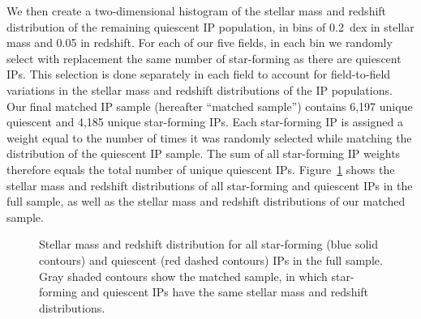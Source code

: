 We then create a two-dimensional histogram of the stellar mass and redshift distribution of the remaining quiescent IP population, in bins of 0.2~dex in stellar mass and 0.05 in redshift.
For each of our five fields, in each bin we randomly select with replacement the same number of star-forming as there are quiescent IPs.
This selection is done separately in each field to account for field-to-field variations in the stellar mass and redshift distributions of the IP populations.
Our final matched IP sample (hereafter ``matched sample'') contains 6,197 unique quiescent and 4,185 unique star-forming IPs.
Each star-forming IP is assigned a weight equal to the number of times it was randomly selected while matching the distribution of the quiescent IP sample.
The sum of all star-forming IP weights therefore equals the total number of unique quiescent IPs.
Figure~\ref{fig:IPsample_matched} shows the stellar mass and redshift distributions of all star-forming and quiescent IPs in the full sample, as well as the stellar mass and redshift distributions of our matched sample.

\begin{figure}
  \epstrim{0.4in 0.2in 0.2in 0.4in}
  \caption{Stellar mass and redshift distribution for all star-forming (blue solid contours) and quiescent (red dashed contours) IPs in the full sample. 
Gray shaded contours show the matched sample, in which star-forming and quiescent IPs have the same stellar mass and redshift distributions.
} 
  \label{fig:IPsample_matched}
\end{figure}

